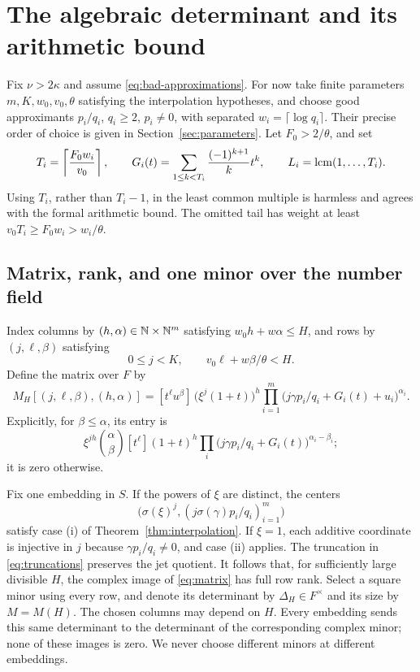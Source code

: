 \section{The algebraic determinant and its arithmetic bound}
\label{sec:arithmetic}

Fix \(\nu>2\kappa\) and assume \eqref{eq:bad-approximations}.
For now take finite parameters \(m,K,w_0,v_0,\theta\) satisfying the
interpolation hypotheses, and choose good approximants
\(p_i/q_i\), \(q_i\ge2\), \(p_i\ne0\), with separated
\(w_i=\lceil\log q_i\rceil\). Their precise order of choice is
given in Section~\ref{sec:parameters}.
Let \(F_0>2/\theta\), and set
\begin{equation}\label{eq:truncations}
 T_i=\left\lceil\frac{F_0w_i}{v_0}\right\rceil,\qquad
 G_i(t)=\sum_{1\le k<T_i}\frac{(-1)^{k+1}}{k}t^k,\qquad
 L_i=\operatorname{lcm}(1,\ldots,T_i).
\end{equation}
Using \(T_i\), rather than \(T_i-1\), in the least common multiple
is harmless and agrees with the formal arithmetic bound.
The omitted tail has weight at least \(v_0T_i\ge F_0w_i>w_i/\theta\).

\subsection{Matrix, rank, and one minor over the number field}

Index columns by \((h,\alpha)\in\mathbb N\times\mathbb N^m\) satisfying
\(w_0h+w\alpha\le H\), and rows by
\((j,\ell,\beta)\) satisfying
\[
 0\le j<K,\qquad v_0\ell+w\beta/\theta<H.
\]
Define the matrix over \(F\) by
\begin{equation}\label{eq:matrix}
 M_H[(j,\ell,\beta),(h,\alpha)]
 =[t^\ell u^\beta]\,
   \bigl(\xi^j(1+t)\bigr)^h
   \prod_{i=1}^m
    \bigl(j\gamma p_i/q_i+G_i(t)+u_i\bigr)^{\alpha_i}.
\end{equation}
Explicitly, for \(\beta\le\alpha\), its entry is
\begin{equation}\label{eq:binomial-entry}
 \xi^{jh}\binom{\alpha}{\beta}
 [t^\ell](1+t)^h
   \prod_i\bigl(j\gamma p_i/q_i+G_i(t)\bigr)^{\alpha_i-\beta_i};
\end{equation}
it is zero otherwise.

Fix one embedding in \(S\). If the powers of \(\xi\) are distinct,
the centers
\[
 \bigl(\sigma(\xi)^j,
       (j\sigma(\gamma)p_i/q_i)_{i=1}^m\bigr)
\]
satisfy case (i) of Theorem~\ref{thm:interpolation}.
If \(\xi=1\), each additive coordinate is injective in \(j\)
because \(\gamma p_i/q_i\ne0\), and case (ii) applies.
The truncation in \eqref{eq:truncations} preserves the jet quotient.
It follows that, for sufficiently large divisible \(H\), the
complex image of \eqref{eq:matrix} has full row rank.
Select a square minor using every row, and denote its determinant
by \(\Delta_H\in F^\times\) and its size by \(M=M(H)\).
The chosen columns may depend on \(H\).
Every embedding sends this same determinant to the determinant of
the corresponding complex minor; none of these images is zero.
We never choose different minors at different embeddings.


